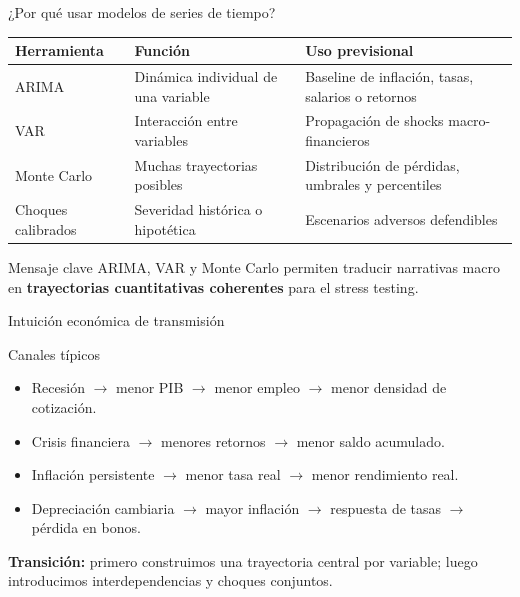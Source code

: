 \documentclass[10pt,aspectratio=169]{beamer}
\begin{document}
\begin{frame}{¿Por qué usar modelos de series de tiempo?}
\begin{table}
\small
\begin{tabular}{p{3.0cm}p{4.4cm}p{4.2cm}}
\toprule
Herramienta & Función & Uso previsional \\
\midrule
ARIMA & Dinámica individual de una variable & Baseline de inflación, tasas, salarios o retornos \\
VAR & Interacción entre variables & Propagación de shocks macro-financieros \\
Monte Carlo & Muchas trayectorias posibles & Distribución de pérdidas, umbrales y percentiles \\
Choques calibrados & Severidad histórica o hipotética & Escenarios adversos defendibles \\
\bottomrule
\end{tabular}
\end{table}

\begin{exampleblock}{Mensaje clave}
ARIMA, VAR y Monte Carlo permiten traducir narrativas macro en \textbf{trayectorias cuantitativas coherentes} para el stress testing.
\end{exampleblock}
\end{frame}

\begin{frame}{Intuición económica de transmisión}
\begin{block}{Canales típicos}
\begin{itemize}
    \item Recesión $\rightarrow$ menor PIB $\rightarrow$ menor empleo $\rightarrow$ menor densidad de cotización.
    \item Crisis financiera $\rightarrow$ menores retornos $\rightarrow$ menor saldo acumulado.
    \item Inflación persistente $\rightarrow$ menor tasa real $\rightarrow$ menor rendimiento real.
    \item Depreciación cambiaria $\rightarrow$ mayor inflación $\rightarrow$ respuesta de tasas $\rightarrow$ pérdida en bonos.
\end{itemize}
\end{block}

\vspace{0.3cm}
\textbf{Transición:} primero construimos una trayectoria central por variable; luego introducimos interdependencias y choques conjuntos.
\end{frame}
\end{document}
